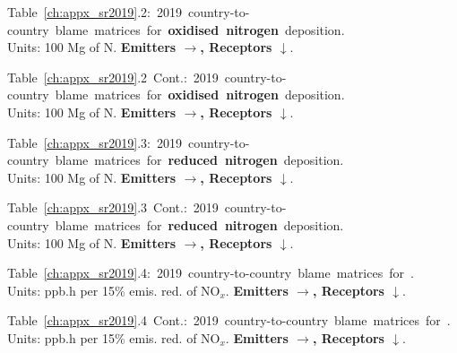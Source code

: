 \footnotesize{\mbox{Table \ref{ch:appx_sr2019}.2: 2019 country-to-country blame matrices for \textbf{oxidised nitrogen} deposition.}\\ Units: 100 Mg of N. \textbf{Emitters $\rightarrow$, Receptors $\downarrow$}. }\\[\baselineskip]\enlargethispage{\myenlarge} \hspace{-0.5cm} 
\centerline{}\clearpage
\footnotesize{\mbox{Table \ref{ch:appx_sr2019}.2 Cont.: 2019 country-to-country blame matrices for \textbf{oxidised nitrogen} deposition.}\\ Units: 100 Mg of N. \textbf{Emitters $\rightarrow$, Receptors $\downarrow$}. }\\[\baselineskip]\enlargethispage{\myenlarge} \hspace{-0.5cm} 
\centerline{}\clearpage

\footnotesize{\mbox{Table \ref{ch:appx_sr2019}.3: 2019 country-to-country blame matrices for \textbf{reduced nitrogen} deposition.}\\ Units: 100 Mg of N. \textbf{Emitters $\rightarrow$, Receptors $\downarrow$}. }\\[\baselineskip]\enlargethispage{\myenlarge} \hspace{-0.5cm} 
\centerline{}\clearpage
\footnotesize{\mbox{Table \ref{ch:appx_sr2019}.3 Cont.: 2019 country-to-country blame matrices for \textbf{reduced nitrogen} deposition.}\\ Units: 100 Mg of N. \textbf{Emitters $\rightarrow$, Receptors $\downarrow$}. }\\[\baselineskip]\enlargethispage{\myenlarge} \hspace{-0.5cm} 
\centerline{}\clearpage

\footnotesize{\mbox{Table \ref{ch:appx_sr2019}.4: 2019 country-to-country blame matrices for \textbf{\aotucf}.}\\ Units: ppb.h per 15\% emis. red. of NO$_x$. \textbf{Emitters $\rightarrow$, Receptors $\downarrow$}. }\\[\baselineskip]\enlargethispage{\myenlarge} \hspace{-0.5cm} 
\centerline{}\clearpage
\footnotesize{\mbox{Table \ref{ch:appx_sr2019}.4 Cont.: 2019 country-to-country blame matrices for \textbf{\aotucf}.}\\ Units: ppb.h per 15\% emis. red. of NO$_x$. \textbf{Emitters $\rightarrow$, Receptors $\downarrow$}. }\\[\baselineskip]\enlargethispage{\myenlarge} \hspace{-0.5cm} 
\centerline{}\clearpage


